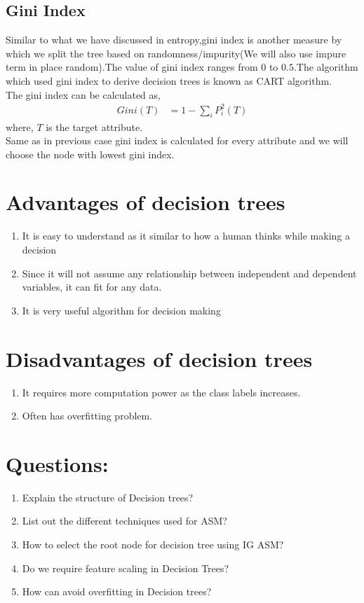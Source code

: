 \documentclass[journal,12pt,onecolumn]{IEEEtran}
\providecommand{\brak}[1]{\ensuremath{\left(#1\right)}}
\theoremstyle{remark}
\numberwithin{equation}{section}
\begin{document}
        \subsection{Gini Index}
	 Similar to what we have discussed in entropy,gini index is another measure by which we split the tree based on randomness/impurity(We will also use impure term in place random).The value of gini index ranges from $0$ to $0.5$.The algorithm which used gini index to derive decision trees is known as CART algorithm.\\The gini index can be calculated as,
	   \begin{align}
		   Gini\brak{T} &= 1 - \sum_iP_i^2\brak{T}
	   \end{align}
         where, $T$ is the target attribute.\\
	 Same as in previous case gini index is calculated for every attribute and we will choose the node with lowest gini index.
       \section{Advantages of decision trees}
        \begin{enumerate}
	 \item It is easy to understand as it similar to how a human thinks while making a decision
         \item Since it will not assume any relationship between independent and dependent variables, it can fit for any data.
         \item It is very useful algorithm for decision making
	\end{enumerate}
       \section{Disadvantages of decision trees}
         \begin{enumerate}
	   \item It requires more computation power as the class labels increases.
	   \item Often has overfitting problem.
	 \end{enumerate}
       \section{Questions:}
         \begin{enumerate}
	  \item Explain the structure of Decision trees?
	  \item List out the different techniques used for ASM?
	  \item How to select the root node for decision tree using IG ASM?
	  \item Do we require feature scaling in Decision Trees?
	  \item How can avoid overfitting in Decision trees?
         \end{enumerate}
\end{document}
